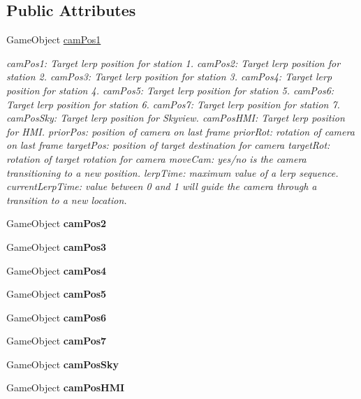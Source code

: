 \subsection*{Public Attributes}
\begin{DoxyCompactItemize}
\item 
Game\+Object \hyperlink{class_gardei___cam_pan_a22ff78b430a317e7871a396f35b097e6}{cam\+Pos1}
\begin{DoxyCompactList}\small\item\em cam\+Pos1\+: Target lerp position for station 1. cam\+Pos2\+: Target lerp position for station 2. cam\+Pos3\+: Target lerp position for station 3. cam\+Pos4\+: Target lerp position for station 4. cam\+Pos5\+: Target lerp position for station 5. cam\+Pos6\+: Target lerp position for station 6. cam\+Pos7\+: Target lerp position for station 7. cam\+Pos\+Sky\+: Target lerp position for Skyview. cam\+Pos\+H\+MI\+: Target lerp position for H\+MI. prior\+Pos\+: position of camera on last frame prior\+Rot\+: rotation of camera on last frame target\+Pos\+: position of target destination for camera target\+Rot\+: rotation of target rotation for camera move\+Cam\+: yes/no is the camera transitioning to a new position. lerp\+Time\+: maximum value of a lerp sequence. current\+Lerp\+Time\+: value between 0 and 1 will guide the camera through a transition to a new location. \end{DoxyCompactList}\item 
\mbox{\label{class_gardei___cam_pan_aa4cfc9789ca0088602358fea82ad51fa}} 
Game\+Object {\bfseries cam\+Pos2}
\item 
\mbox{\label{class_gardei___cam_pan_a5d21560f6c457bc96518f09db74f6a6d}} 
Game\+Object {\bfseries cam\+Pos3}
\item 
\mbox{\label{class_gardei___cam_pan_ac6e127172963ce5e0300c145637e7838}} 
Game\+Object {\bfseries cam\+Pos4}
\item 
\mbox{\label{class_gardei___cam_pan_a5454f0988f8e6290c468a25741f82456}} 
Game\+Object {\bfseries cam\+Pos5}
\item 
\mbox{\label{class_gardei___cam_pan_a569365c3a56003d9e0208b3043d4623d}} 
Game\+Object {\bfseries cam\+Pos6}
\item 
\mbox{\label{class_gardei___cam_pan_a4d524c86c24d5bb5a1582015c851cf88}} 
Game\+Object {\bfseries cam\+Pos7}
\item 
\mbox{\label{class_gardei___cam_pan_a36c938a200942175f96689573de1335b}} 
Game\+Object {\bfseries cam\+Pos\+Sky}
\item 
\mbox{\label{class_gardei___cam_pan_ad010b6b5ec0254cc2fd93c04a8062353}} 
Game\+Object {\bfseries cam\+Pos\+H\+MI}
\end{DoxyCompactItemize}


